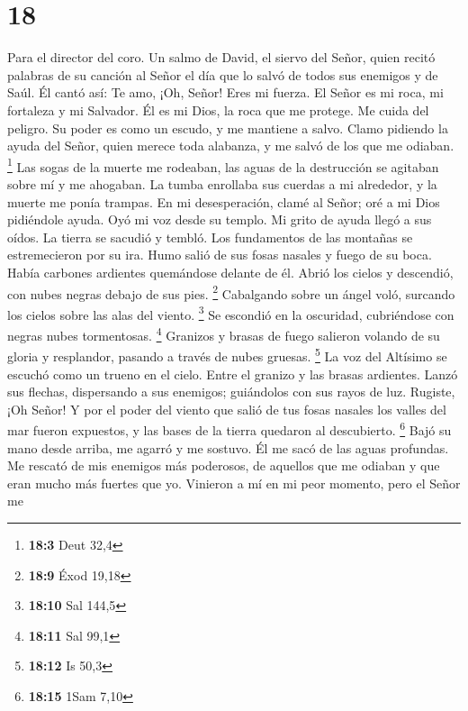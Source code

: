 \hypertarget{section-17}{%
\section{18}\label{section-17}}

Para el director del coro. Un salmo de David, el siervo del Señor, quien
recitó palabras de su canción al Señor el día que lo salvó de todos sus
enemigos y de Saúl. Él cantó así:  Te amo, ¡Oh, Señor! Eres
mi fuerza.  El Señor es mi roca, mi fortaleza y mi Salvador.
Él es mi Dios, la roca que me protege. Me cuida del peligro. Su poder es
como un escudo, y me mantiene a salvo.  Clamo pidiendo la
ayuda del Señor, quien merece toda alabanza, y me salvó de los que me
odiaban. \footnote{\textbf{18:3} Deut 32,4}  Las sogas de la
muerte me rodeaban, las aguas de la destrucción se agitaban sobre mí y
me ahogaban.  La tumba enrollaba sus cuerdas a mi alrededor,
y la muerte me ponía trampas.  En mi desesperación, clamé al
Señor; oré a mi Dios pidiéndole ayuda. Oyó mi voz desde su templo. Mi
grito de ayuda llegó a sus oídos.  La tierra se sacudió y
tembló. Los fundamentos de las montañas se estremecieron por su ira.
 Humo salió de sus fosas nasales y fuego de su boca. Había
carbones ardientes quemándose delante de él.  Abrió los
cielos y descendió, con nubes negras debajo de sus pies. \footnote{\textbf{18:9}
  Éxod 19,18}  Cabalgando sobre un ángel voló, surcando los
cielos sobre las alas del viento. \footnote{\textbf{18:10} Sal 144,5}
 Se escondió en la oscuridad, cubriéndose con negras nubes
tormentosas. \footnote{\textbf{18:11} Sal 99,1}  Granizos y
brasas de fuego salieron volando de su gloria y resplandor, pasando a
través de nubes gruesas. \footnote{\textbf{18:12} Is 50,3} 
La voz del Altísimo se escuchó como un trueno en el cielo. Entre el
granizo y las brasas ardientes.  Lanzó sus flechas,
dispersando a sus enemigos; guiándolos con sus rayos de luz.
 Rugiste, ¡Oh Señor! Y por el poder del viento que salió de
tus fosas nasales los valles del mar fueron expuestos, y las bases de la
tierra quedaron al descubierto. \footnote{\textbf{18:15} 1Sam 7,10}
 Bajó su mano desde arriba, me agarró y me sostuvo. Él me
sacó de las aguas profundas.  Me rescató de mis enemigos
más poderosos, de aquellos que me odiaban y que eran mucho más fuertes
que yo.  Vinieron a mí en mi peor momento, pero el Señor me
